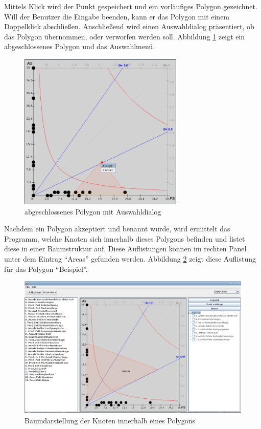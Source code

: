 Mittels Klick wird der Punkt gespeichert und ein vorläufiges Polygon gezeichnet. Will der Benutzer die Eingabe beenden, kann er das Polygon mit einem Doppelklick abschließen. Anschließend wird einen Auswahldialog präsentiert, ob das Polygon übernommen, oder verworfen werden soll.
Abbildung \ref{menü} zeigt ein abgeschlossenes Polygon und das Auswahlmenü.
\begin{figure}[h]
	\centering
	\includegraphics[width=0.7\textwidth]{pictures/menu.png}
	\caption{abgeschlossenes Polygon mit Auswahldialog}
	\label{menü}
\end{figure}

Nachdem ein Polygon akzeptiert und benannt wurde, wird ermittelt das Programm, welche Knoten sich innerhalb dieses Polygons befinden und listet diese in einer Baumstruktur auf. Diese Auflistungen können im rechten Panel unter dem Eintrag ``Areas'' gefunden werden. Abbildung \ref{baum} zeigt diese Auflistung für das Polygon ``Beispiel''.
\begin{figure}[h]
	\centering
	\includegraphics[width=1\textwidth]{pictures/baum.png}
	\caption{Baumdarstellung der Knoten innerhalb eines Polygons}
	\label{baum}
\end{figure}

